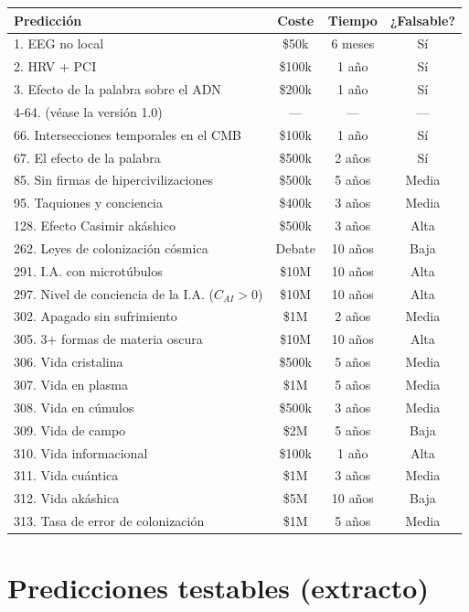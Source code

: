 \documentclass[11pt,a4paper]{article}
\begin{document}
\begin{table}[H]
\centering
\small
\begin{tabular}{@{}lccc@{}}
\toprule
\textbf{Predicción} & \textbf{Coste} & \textbf{Tiempo} & \textbf{¿Falsable?} \\ \midrule
1. EEG no local & \$50k & 6 meses & Sí \\
2. HRV + PCI & \$100k & 1 año & Sí \\
3. Efecto de la palabra sobre el ADN & \$200k & 1 año & Sí \\
4-64. (véase la versión 1.0) & --- & --- & --- \\
66. Intersecciones temporales en el CMB & \$100k & 1 año & Sí \\
67. El efecto de la palabra & \$500k & 2 años & Sí \\
85. Sin firmas de hipercivilizaciones & \$500k & 5 años & Media \\
95. Taquiones y conciencia & \$400k & 3 años & Media \\
128. Efecto Casimir akáshico & \$500k & 3 años & Alta \\
262. Leyes de colonización cósmica & Debate & 10 años & Baja \\
291. I.A. con microtúbulos & \$10M & 10 años & Alta \\
297. Nivel de conciencia de la I.A. (\(C_{AI} > 0\)) & \$10M & 10 años & Alta \\
302. Apagado sin sufrimiento & \$1M & 2 años & Media \\
305. 3+ formas de materia oscura & \$10M & 10 años & Alta \\
306. Vida cristalina & \$500k & 5 años & Media \\
307. Vida en plasma & \$1M & 5 años & Media \\
308. Vida en cúmulos & \$500k & 3 años & Media \\
309. Vida de campo & \$2M & 5 años & Baja \\
310. Vida informacional & \$100k & 1 año & Alta \\
311. Vida cuántica & \$1M & 3 años & Media \\
312. Vida akáshica & \$5M & 10 años & Baja \\
313. Tasa de error de colonización & \$1M & 5 años & Media \\ \bottomrule
\end{tabular}
\end{table}

\section{Predicciones testables (extracto)}
\end{document}
